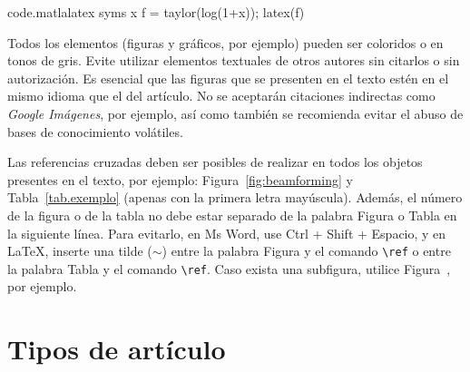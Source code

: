 \documentclass[12pt, a4paper, twoside, twocolumn]{article}
\begin{document}
\begin{matlabcode}{code.matlalatex}
  syms x
  f = taylor(log(1+x));
  latex(f)
\end{matlabcode}

Todos los elementos (figuras y gráficos, por ejemplo) pueden ser coloridos o en tonos de gris. Evite utilizar elementos textuales de otros autores sin citarlos o sin autorización. Es esencial que las figuras que se presenten en el texto estén en el mismo idioma que el del artículo. No se aceptarán citaciones indirectas como \textit{Google Imágenes}, por ejemplo, así como también se recomienda evitar el abuso de bases de conocimiento volátiles.

Las referencias cruzadas deben ser posibles de realizar en todos los objetos presentes en el texto, por ejemplo: Figura~\ref{fig:beamforming} y Tabla~\ref{tab.exemplo} (apenas con la primera letra mayúscula). Además, el número de la figura o de la tabla no debe estar separado de la palabra Figura o Tabla en la siguiente línea. Para evitarlo, en Ms Word, use Ctrl + Shift + Espacio, y en \LaTeX, inserte una tilde ($\sim$) entre la palabra Figura y el comando \verb=\ref= o entre la palabra Tabla y el comando \verb=\ref=. Caso exista una subfigura, utilice Figura~, por ejemplo.


\section{Tipos de artículo}
\end{document}
